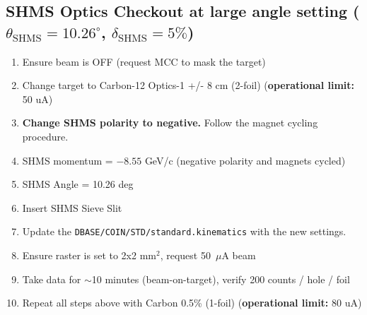 \documentclass{article}
\begin{document}
\subsection*{SHMS Optics Checkout at large angle setting ($\theta_{\mathrm{SHMS}} =10.26^{\circ}$, $\delta_{\mathrm{SHMS}}=5\%$)}
\begin{enumerate}
    \item Ensure beam is OFF (request MCC to mask the target)
    \item Change target to Carbon-12 Optics-1 +/- 8 cm (2-foil) (\textbf{operational limit:} 50 uA) 
    \item \textbf{Change SHMS polarity to negative.} Follow the magnet cycling procedure. 
    \item SHMS momentum = $-8.55$ GeV/c (negative polarity and magnets cycled) 
    \item SHMS Angle = 10.26  deg
    \item Insert SHMS Sieve Slit
    \item Update the \texttt{DBASE/COIN/STD/standard.kinematics} with the new settings.
    \item Ensure raster is set to 2x2 mm$^{2}$, request 50~$\mu$A beam
    \item Take data for $\sim$10 minutes (beam-on-target), verify 200 counts / hole / foil
    \item Repeat all steps above with Carbon 0.5\% (1-foil) (\textbf{operational limit:} 80 uA)
\end{enumerate}
\end{document}
